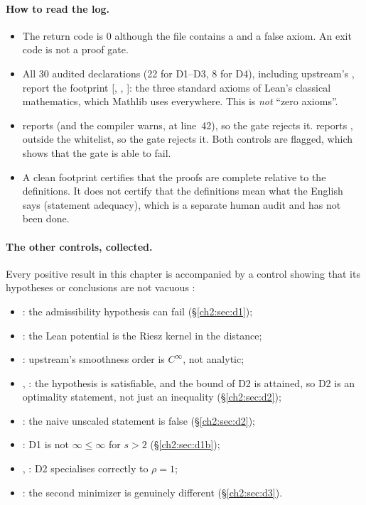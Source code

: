 \paragraph{How to read the log.}
\begin{itemize}
\item The return code is $0$ although the file contains a  and a false axiom. An exit code is not a proof
  gate.
\item All 30 audited declarations (22 for D1--D3, 8 for D4), including upstream's , report the footprint
  [, , ]: the three standard axioms of Lean's classical
  mathematics, which Mathlib uses everywhere. This is \emph{not} ``zero axioms''. \tierA
\item {} reports  (and the compiler warns, at line~42), so the gate rejects it.
   reports , outside the whitelist, so the gate rejects it. Both controls are flagged,
  which shows that the gate is able to fail.
\item A clean footprint certifies that the proofs are complete relative to the definitions. It does not certify that
  the definitions mean what the English says (statement adequacy), which is a separate human audit and has not been
  done.
\end{itemize}

\paragraph{The other controls, collected.} Every positive result in this chapter is accompanied by a control showing that
its hypotheses or conclusions are not vacuous \tierA:
\begin{itemize}
\item {}: the admissibility hypothesis can fail (\S\ref{ch2:sec:d1});
\item {}: the Lean potential is the Riesz kernel in the distance;
\item {}: upstream's smoothness order is $C^\infty$, not analytic;
\item {}, : the hypothesis  is satisfiable, and the bound of D2 is
  attained, so D2 is an optimality statement, not just an inequality (\S\ref{ch2:sec:d2});
\item {}: the naive unscaled statement is false (\S\ref{ch2:sec:d2});
\item {}: D1 is not $\infty\le\infty$ for $s>2$ (\S\ref{ch2:sec:d1b});
\item {}, : D2 specialises correctly to $\rho=1$;
\item {}: the second minimizer is genuinely different (\S\ref{ch2:sec:d3}).
\end{itemize}

